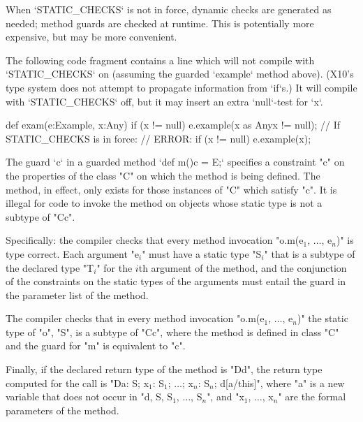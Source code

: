 When \xcd`STATIC_CHECKS` is not in force, dynamic checks are generated as
needed; method guards are checked at runtime. This is potentially more
expensive, but may be more convenient. 

\begin{ex}
The following code fragment contains a line which will not compile 
with \xcd`STATIC_CHECKS` on (assuming the guarded \xcd`example` method above).  (X10's type system does not attempt to propagate 
information from \xcd`if`s.)  It will compile with \xcd`STATIC_CHECKS` off,
but it may insert an extra \xcd`null`-test for \xcd`x`.  
\begin{xten}
  def exam(e:Example, x:Any) {
    if (x != null) 
       e.example(x as Any{x != null});
       // If STATIC_CHECKS is in force: 
       // ERROR: if (x != null) e.example(x); 
  }
\end{xten}
\end{ex}


The guard \xcd`{c}` 
in a guarded method 
\xcd`def m(){c} = E;`
specifies a constraint \xcd"c" on the
properties of the class \xcd"C" on which the method is being defined. The
method, in effect, only exists  for those instances of \xcd"C" which satisfy
\xcd"c".  It is 
illegal for code to invoke the method on objects whose static type is
not a subtype of \xcd"C{c}".

Specifically: 
    the compiler checks that every method invocation
    \xcdmath"o.m(e$_1$, $\dots$, e$_n$)"
    is type correct. Each argument
    \xcdmath"e$_i$" must have a
    static type \xcdmath"S$_i$" that is a subtype of the declared type
    \xcdmath"T$_i$" for the $i$th
    argument of the method, and the conjunction of the constraints on the
    static types 
    of the arguments must entail the guard in the parameter list
    of the method.

    The compiler checks that in every method invocation
    \xcdmath"o.m(e$_1$, $\dots$, e$_n$)"
    the static type of \xcd"o", \xcd"S", is a subtype of \xcd"C{c}", where the method
    is defined in class \xcd"C" and the guard for \xcd"m" is equivalent to
    \xcd"c".

    Finally, if the declared return type of the method is
    \xcd"D{d}", the
    return type computed for the call is
    \xcdmath"D{a: S; x$_1$: S$_1$; $\dots$; x$_n$: S$_n$; d[a/this]}",
    where \xcd"a" is a new
    variable that does not occur in
    \xcdmath"d, S, S$_1$, $\dots$, S$_n$", and
    \xcdmath"x$_1$, $\dots$, x$_n$" are the formal
    parameters of the method.


